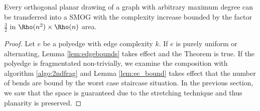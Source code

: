 \begin{theorem}
	Every orthogonal planar drawing of a graph with arbitrary maximum degree can be transferred into a SMOG with the complexity increase bounded by the factor $\frac{3}{2}$ in $\Rho(n^2)\times\Rho(n)$ area.
\end{theorem}
\begin{proof}
	Let $e$ be a polyedge with edge complexity $k$. If $e$ is purely uniform or alternating, Lemma \ref{lem:edgebounds} takes effect and the Theorem is true. If the polyedge is fragmentated non-trivially, we examine the composition with algorithm \ref{algo:2ndfrag} and Lemma \ref{lem:ec_bound} takes effect that the number of bends are bound by the worst case staircase situation. In the previous section, we saw that the space is guaranteed due to the stretching technique and thus planarity is preserved.
\end{proof}
